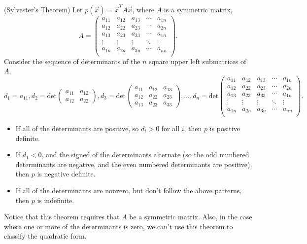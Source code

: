 \documentclass{ximera}
\begin{document}
\begin{theorem}
(Sylvester's Theorem) Let $p(\vec{x}) = \vec{x}^TA\vec{x}$, where $A$ is a symmetric matrix, 
\[
A = \begin{pmatrix}
a_{11} & a_{12} & a_{13} & \cdots & a_{1n}\\
a_{12} & a_{22} & a_{23} & \cdots & a_{2n}\\
a_{13} & a_{23} & a_{33} & \cdots & a_{1n}\\
\vdots & \vdots & \vdots & \ddots & \vdots\\
a_{1n} & a_{2n} & a_{3n} & \cdots & a_{nn}\\
\end{pmatrix}.
\]
Consider the sequence of determinants of the $n$ square upper left submatrices of $A$, 
\[
d_1 = a_{11}, d_2 = \text{det}\begin{pmatrix}a_{11} & a_{12}\\ a_{12} & a_{22}\end{pmatrix}, d_3 = \text{det}\begin{pmatrix}a_{11} & a_{12} & a_{13}\\ a_{12} & a_{22} & a_{23}\\ a_{13} & a_{23} & a_{33}\end{pmatrix},...,d_n = \text{det}\begin{pmatrix}
a_{11} & a_{12} & a_{13} & \cdots & a_{1n}\\
a_{12} & a_{22} & a_{23} & \cdots & a_{2n}\\
a_{13} & a_{23} & a_{33} & \cdots & a_{1n}\\
\vdots & \vdots & \vdots & \ddots & \vdots\\
a_{1n} & a_{2n} & a_{3n} & \cdots & a_{nn}\\
\end{pmatrix}.
\]
\begin{itemize}
\item If all of the determinants are positive, so $d_i>0$ for all $i$, then $p$ is positive definite.
\item If $d_1 < 0$, and the signed of the determinants alternate (so the odd numbered determinants are negative, and the even numbered determinants are positive), then $p$ is negative definite.
\item If all of the determinants are nonzero, but don't follow the above patterns, then $p$ is indefinite.
\end{itemize}
\end{theorem}

Notice that this theorem requires that $A$ be a symmetric matrix. Also, in the case where one or more of the determinants is zero, we can't use this theorem to classify the quadratic form.
\end{document}
